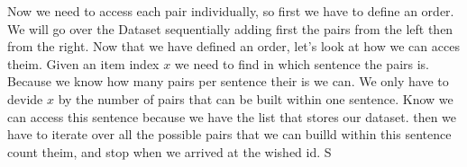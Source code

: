 Now we need to access each pair individually, so first we have to define an order. We will go over the Dataset sequentially adding first the pairs from the left then from the right. Now that we have defined an order, let's look at how we can acces theim. Given an item index $x$ we need to find in which sentence the pairs is. Because we know how many pairs per sentence their is we can. We only have to devide $x$ by the number of pairs that can be built within one sentence. Know we can access this sentence because we have the list that stores our dataset. then we have to iterate over all the possible pairs that we can builld within this sentence count theim, and stop when we arrived at the wished id. S

